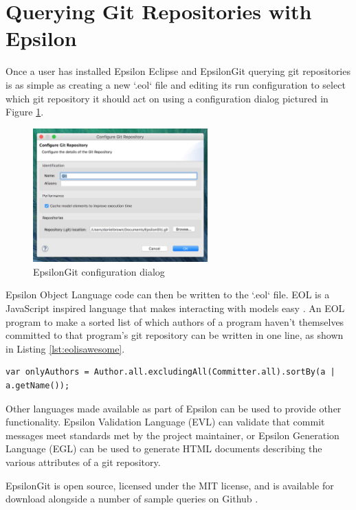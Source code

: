 \documentclass[runningheads,a4paper]{llncs}
\begin{document}
\section{Querying Git Repositories with Epsilon}
Once a user has installed Epsilon Eclipse and EpsilonGit querying git repositories is as simple as creating a new `.eol` file and editing its run configuration to select which git repository it should act on using a configuration dialog pictured in Figure \ref{fig:configurationdialog}.

\begin{figure}[h]
	\centering
	\includegraphics[width=0.6\textwidth]{../thesis/images/configurationdialog}
	\caption{EpsilonGit configuration dialog}
	\label{fig:configurationdialog}
\end{figure} 

Epsilon Object Language code can then be written to the `.eol` file. EOL is a JavaScript inspired language that makes interacting with models easy \cite{epsilonhomepage}. An EOL program to make a sorted list of which authors of a program haven't themselves committed to that program's git repository can be written in one line, as shown in Listing \ref{lst:eolisawesome}.

\begin{lstlisting}[caption=Author vs Committer Information, label=lst:eolisawesome]
var onlyAuthors = Author.all.excludingAll(Committer.all).sortBy(a | a.getName());
\end{lstlisting}

Other languages made available as part of Epsilon can be used to provide other functionality. Epsilon Validation Language (EVL) can validate that commit messages meet standards met by the project maintainer, or Epsilon Generation Language (EGL) can be used to generate HTML documents describing the various attributes of a git repository.

EpsilonGit is open source, licensed under the MIT license, and is available for download alongside a number of sample queries on Github \cite{epsilongitgithub}.
\end{document}
